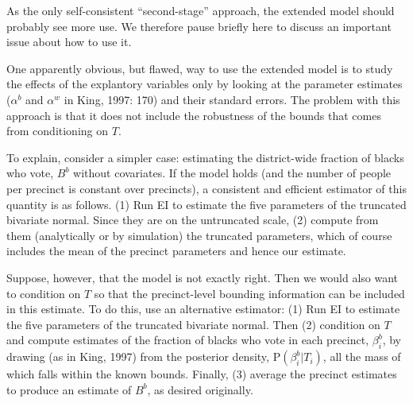 \documentclass[11pt,titlepage]{article}
\renewcommand{\P}{\text{P}}
\begin{document}
As the only self-consistent ``second-stage'' approach, the extended
model should probably see more use.  We therefore pause briefly here
to discuss an important issue about how to use it.  

One apparently obvious, but flawed, way to use the extended model is
to study the effects of the explantory variables only by looking at
the parameter estimates ($\alpha^b$ and $\alpha^w$ in King, 1997: 170)
and their standard errors.  The problem with this approach is that it
does not include the robustness of the bounds that comes from
conditioning on $T$.  

To explain, consider a simpler case: estimating the district-wide
fraction of blacks who vote, $B^b$ without covariates.  If the model
holds (and the number of people per precinct is constant over
precincts), a consistent and efficient estimator of this quantity is
as follows.  (1) Run EI to estimate the five parameters of the
truncated bivariate normal.  Since they are on the untruncated scale,
(2) compute from them (analytically or by simulation) the truncated
parameters, which of course includes the mean of the precinct
parameters and hence our estimate.

Suppose, however, that the model is not exactly right.  Then we would
also want to condition on $T$ so that the precinct-level bounding
information can be included in this estimate.  To do this, use an
alternative estimator: (1) Run EI to estimate the five parameters of
the truncated bivariate normal.  Then (2) condition on $T$ and compute
estimates of the fraction of blacks who vote in each precinct,
$\beta_i^b$, by drawing (as in King, 1997) from the posterior density,
$\P(\beta_i^b|T_i)$, all the mass of which falls within the known
bounds.  Finally, (3) average the precinct estimates to produce an
estimate of $B^b$, as desired originally.
\end{document}
